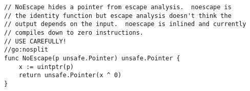 \begin{lstlisting}[language=Golang, label=lst:no-escape-function, caption=No-Escape Function Pattern]
// NoEscape hides a pointer from escape analysis.  noescape is
// the identity function but escape analysis doesn't think the
// output depends on the input.  noescape is inlined and currently
// compiles down to zero instructions.
// USE CAREFULLY!
//go:nosplit
func NoEscape(p unsafe.Pointer) unsafe.Pointer {
    x := uintptr(p)
    return unsafe.Pointer(x ^ 0)
}
\end{lstlisting}